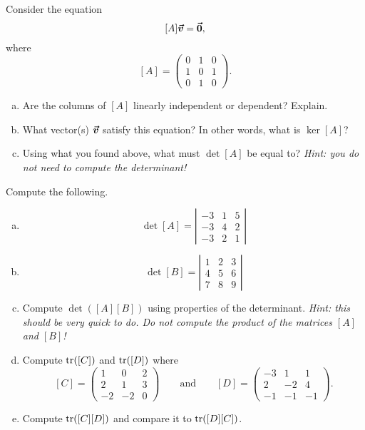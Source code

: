 \documentclass[12pt]{article} %
\begin{document}
\begin{problem}
Consider the equation
\[
[A]\boldsymbol{\vec{v}} = \boldsymbol{\vec{0}},
\]
where
\[
[A] = \begin{pmatrix} 0 & 1 & 0 \\ 1 & 0 & 1 \\ 0 & 1 & 0 \end{pmatrix}.
\]
\begin{enumerate}[(a)]
    \item Are the columns of $[A]$ linearly independent or dependent? Explain.
    \item What vector(s) $\boldsymbol{\vec{v}}$ satisfy this equation? In other words, what is $\ker[A]$?
    \item Using what you found above, what must $\det[A]$ be equal to? \emph{Hint: you do not need to compute the determinant!}
\end{enumerate}
\end{problem}

\begin{problem}
Compute the following.
\begin{enumerate}[(a)]
    \item
    \[
    \det[A]=\left| \begin{array}{ccc}
    -3& 1 & 5\\
    -3& 4 & 2\\
    -3& 2 & 1
    \end{array}\right|
    \]
    \item
    \[
    \det[B]=\left| \begin{array}{ccc}
    1& 2& 3\\
    4& 5& 6\\
    7& 8& 9
    \end{array}\right|
    \]
    \item Compute $\det([A][B])$ using properties of the determinant. \emph{Hint: this should be very quick to do. Do not compute the product of the matrices $[A]$ and $[B]$!}
    \item Compute $\mathrm{tr}([C])$ and $\mathrm{tr}([D])$ where
    \[
[C]=\begin{pmatrix} 1 & 0 & 2 \\ 2  & 1 & 3 \\ -2 & -2 & 0 \end{pmatrix} \qquad \textrm{and} \qquad [D]=\begin{pmatrix} -3 & 1 & 1 \\ 2 & -2 & 4 \\ -1 & -1 & -1 \end{pmatrix}.
\]
    \item Compute $\mathrm{tr}([C][D])$ and compare it to $\mathrm{tr}([D][C])$.
\end{enumerate}
\end{problem}
\end{document}

